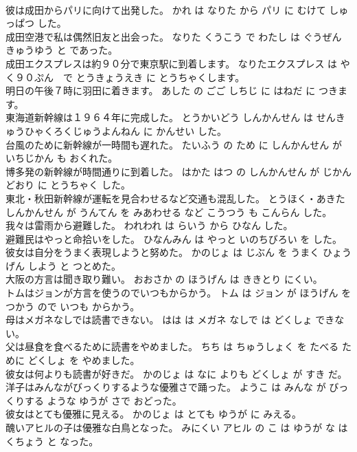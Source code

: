 \documentclass[8pt]{extreport}
\begin{document}
\begin{CJK}{UTF8}{min}
\\	彼は成田からパリに向けて出発した。	かれ は なりた から パリ に むけて しゅっぱつ した。	
\\	成田空港で私は偶然旧友と出会った。	なりた くうこう で わたし は ぐうぜん きゅうゆう と であった。	
\\	成田エクスプレスは約９０分で東京駅に到着します。	なりたエクスプレス は やく９０ぷん　で とうきょうえき に とうちゃくします。	
\\	明日の午後７時に羽田に着きます。	あした の ごご しちじ に はねだ に つきます。	
\\	東海道新幹線は１９６４年に完成した。	とうかいどう しんかんせん は せんきゅうひゃくろくじゅうよんねん に かんせい した。	
\\	台風のために新幹線が一時間も遅れた。	たいふう の ため に しんかんせん が いちじかん も おくれた。	
\\	博多発の新幹線が時間通りに到着した。	はかた はつ の しんかんせん が じかんどおり に とうちゃく した。	
\\	東北・秋田新幹線が運転を見合わせるなど交通も混乱した。	とうほく・あきた しんかんせん が うんてん を みあわせる など こうつう も こんらん した。	
\\	我々は雷雨から避難した。	われわれ は らいう から ひなん した。	
\\	避難民はやっと命拾いをした。	ひなんみん は やっと いのちびろい を した。	
\\	彼女は自分をうまく表現しようと努めた。	かのじょ は じぶん を うまく ひょうげん しよう と つとめた。	
\\	大阪の方言は聞き取り難い。	おおさか の ほうげん は ききとり にくい。	
\\	トムはジョンが方言を使うのでいつもからかう。	トム は ジョン が ほうげん を つかう ので いつも からかう。	
\\	母はメガネなしでは読書できない。	はは は メガネ なしで は どくしょ できない。	
\\	父は昼食を食べるために読書をやめました。	ちち は ちゅうしょく を たべる ために どくしょ を やめました。	
\\	彼女は何よりも読書が好きだ。	かのじょ は なに よりも どくしょ が すき だ。	
\\	洋子はみんながびっくりするような優雅さで踊った。	ようこ は みんな が びっくりする ような ゆうが さで おどった。	
\\	彼女はとても優雅に見える。	かのじょ は とても ゆうが に みえる。	
\\	醜いアヒルの子は優雅な白鳥となった。	みにくい アヒル の こ は ゆうが な はくちょう と なった。	

\end{CJK}
\end{document}
